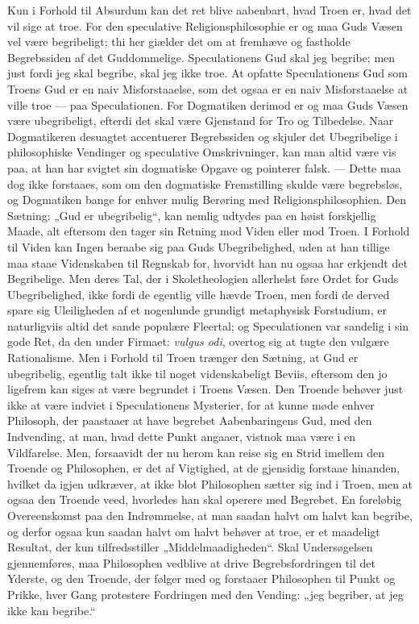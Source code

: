 Kun i Forhold til Absurdum kan det ret blive aabenbart, hvad Troen
er, hvad det vil sige at troe. For den speculative
Religionsphilosophie er og maa Guds Væsen vel være begribeligt;
thi her giælder det om at fremhæve og fastholde Begrebssiden af
det Guddommelige. Speculationens Gud skal jeg begribe; men just
fordi jeg skal begribe, skal jeg ikke troe. At opfatte
Speculationens Gud som Troens Gud er en naiv Misforstaaelse, som
det ogsaa er en naiv Misforstaaelse at ville troe --- paa
Speculationen. For Dogmatiken derimod er og maa Guds Væsen være
ubegribeligt, efterdi det skal være Gjenstand for Tro og
Tilbedelse. Naar Dogmatikeren desuagtet accentuerer Begrebssiden
og skjuler det Ubegribelige i philosophiske Vendinger og
speculative Omskrivninger, kan man altid være vis paa, at han har
svigtet sin dogmatiske Opgave og pointerer falsk. --- Dette maa
dog ikke forstaaes, som om den dogmatiske Fremstilling skulde være
begrebsløs, og Dogmatiken bange for enhver mulig Berøring med
Religionsphilosophien. Den Sætning: „Gud er ubegribelig“, kan
nemlig udtydes paa en høist forskjellig Maade, alt eftersom den
tager sin
 Retning mod Viden eller mod Troen. I Forhold til Viden kan Ingen
beraabe sig paa Guds Ubegribelighed, uden at han tillige maa staae
Videnskaben til Regnskab for, hvorvidt han nu ogsaa har erkjendt
det Begribelige. Men deres Tal, der i Skoletheologien allerhelst
føre Ordet for Guds Ubegribelighed, ikke fordi de egentlig ville
hævde Troen, men fordi de derved spare sig Uleiligheden af et
nogenlunde grundigt metaphysisk Forstudium, er naturligviis altid
det sande populære Fleertal; og Speculationen var sandelig i sin
gode Ret, da den under Firmaet: \textit{vulgus odi}, overtog sig
at tugte den vulgære Rationalisme. Men i Forhold til Troen trænger
den Sætning, at Gud er ubegribelig, egentlig talt ikke til noget
videnskabeligt Beviis, eftersom den jo ligefrem kan siges at være
begrundet i Troens Væsen. Den Troende behøver just ikke at være
indviet i Speculationens Mysterier, for at kunne møde enhver
Philosoph, der paastaaer at have begrebet Aabenbaringens Gud, med
den Indvending, at man, hvad dette Punkt angaaer, vistnok maa være
i en Vildfarelse. Men, forsaavidt der nu herom kan reise sig en
Strid imellem den Troende og Philosophen, er det af Vigtighed, at
de gjensidig forstaae hinanden, hvilket da igjen udkræver, at ikke
blot Philosophen sætter sig ind i Troen, men at ogsaa den Troende
veed, hvorledes han skal operere med Begrebet. En foreløbig
Overeenskomst paa den Indrømmelse, at man saadan halvt om halvt
kan begribe, og derfor ogsaa kun saadan halvt om halvt behøver at
troe, er et
 maadeligt Resultat, der kun tilfredsstiller „Middelmaadigheden“.
Skal Undersøgelsen gjennemføres, maa Philosophen vedblive at drive
Begrebsfordringen til det Yderste, og den Troende, der følger med
og forstaaer Philosophen til Punkt og Prikke, hver Gang protestere
Fordringen med den Vending: „jeg begriber, at jeg ikke kan
begribe.“

